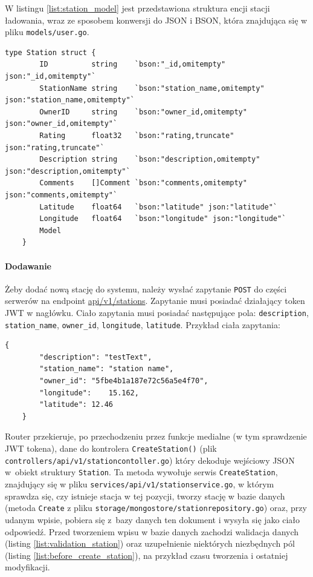 W listingu \ref{list:station_model} jest przedstawiona struktura encji stacji ładowania, wraz ze sposobem konwersji do JSON i BSON, która znajdująca się w pliku \texttt{models/user.go}.
\begin{lstlisting}[label=list:station_model,caption=Model danych stacji ładowania,basicstyle=\tiny\ttfamily]
    type Station struct {
        ID          string    `bson:"_id,omitempty" json:"_id,omitempty"`
        StationName string    `bson:"station_name,omitempty" json:"station_name,omitempty"`
        OwnerID     string    `bson:"owner_id,omitempty" json:"owner_id,omitempty"`
        Rating      float32   `bson:"rating,truncate" json:"rating,truncate"`
        Description string    `bson:"description,omitempty" json:"description,omitempty"`
        Comments    []Comment `bson:"comments,omitempty" json:"comments,omitempty"`
        Latitude    float64   `bson:"latitude" json:"latitude"`
        Longitude   float64   `bson:"longitude" json:"longitude"`
        Model
    }
\end{lstlisting}

\paragraph{Dodawanie\newline}
Żeby dodać nową stację do systemu, należy wysłać zapytanie \texttt{POST} do części serwerów na endpoint \url{api/v1/stations}. Zapytanie musi posiadać działający token JWT w nagłówku. Ciało zapytania musi posiadać następujące pola: \texttt{description}, \texttt{station\_name}, \texttt{owner\_id}, \texttt{longitude}, \texttt{latitude}.
Przykład ciała zapytania:
\begin{lstlisting}[basicstyle=\tiny\ttfamily]
    {
		"description": "testText",
		"station_name": "station name",
		"owner_id": "5fbe4b1a187e72c56a5e4f70",
		"longitude":    15.162,
		"latitude": 12.46
    }
\end{lstlisting}

Router przekieruje, po przechodzeniu przez funkcje medialne (w tym sprawdzenie JWT tokena), dane do kontrolera \texttt{CreateStation()} (plik \texttt{controllers/api/v1/stationcontoller.go}) który dekoduje wejściowy JSON w~obiekt struktury \texttt{Station}.
Ta metoda wywołuje serwis \texttt{CreateStation}, znajdujący się w pliku \texttt{services/api/v1/stationservice.go}, w którym sprawdza się, czy istnieje stacja w tej pozycji, tworzy stację w bazie danych (metoda \texttt{Create} z pliku \texttt{storage/mongostore/stationrepository.go}) oraz, przy udanym wpisie, pobiera się z~bazy danych ten dokument i wysyła się jako ciało odpowiedź.
Przed tworzeniem wpisu w bazie danych zachodzi walidacja danych (listing \ref{list:validation_station}) oraz uzupełnienie niektórych niezbędnych pól (listing \ref{list:before_create_station}), na przykład czasu tworzenia i ostatniej modyfikacji.

